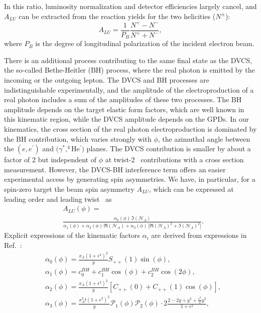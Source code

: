 \documentclass[twocolumn,nofootinbib,prl,superscriptaddress,secnumarabic,amssymb,nobibnotes,aps,floatfix]{revtex4}
\begin{document}
In this ratio, luminosity normalization and detector efficiencies largely 
cancel, and $A_{LU}$ can be extracted from the reaction yields for the two 
helicities ($N^{\pm}$):
\begin{equation}
A_{LU} = \frac{1}{P_{B}} \frac{N^{+} - N^{-}}{N^{+} + N^{-} },
\end{equation}
where $P_{B}$ is the degree of longitudinal polarization of the incident electron beam.

There is an additional process contributing to the same final state as the 
DVCS, the so-called Bethe-Heitler (BH) process, where the real photon is 
emitted by the incoming or the outgoing lepton. The DVCS and BH processes are 
indistinguishable experimentally, and the amplitude of the electroproduction of 
a real photon includes a sum of the amplitudes of these two processes. The BH 
amplitude depends on the target elastic form factors, which are well known in 
this kinematic region, while the DVCS amplitude depends on the GPDs. In our 
kinematics, the cross section of the real photon electroproduction is dominated 
by the BH contribution, which varies strongly with $\phi$, the azimuthal angle 
between the $(e,e^\prime)$ and $(\gamma^*,^4$He$^\prime)$ planes. The DVCS 
contribution is smaller by about a factor of 2 but independent of $\phi$ at 
twist-2~%
contributions with a cross section measurement. However, the DVCS-BH 
interference term offers an easier experimental access by generating spin 
asymmetries. We have, in particular, for a spin-zero target the beam spin 
asymmetry $A_{LU}$, which can be expressed at leading order and leading 
twist~\cite{Kirchner:2003wt,Belitsky:2008bz} as
\begin{equation}
\begin{split}
&A_{LU}(\phi) = \\
&\frac{\alpha_{0}(\phi) \, \Im (\mathcal{H}_{A})}
   {\alpha_{1}(\phi) + \alpha_{2}(\phi) \, \Re (\mathcal{H}_{A}) + 
   \alpha_{3}(\phi) \, \big[ \Re (\mathcal{H}_{A})^{2} + \Im 
(\mathcal{H}_{A})^{2} \big]}.
\end{split}
\label{eq:A_LU-coh}
\end{equation}
Explicit expressions of the kinematic factors $\alpha_i$ are derived from 
expressions in Ref.~\cite{Belitsky:2008bz}:
\begin{equation}
\begin{split}
&\alpha_0 (\phi)  = \frac{x_{A}(1+\epsilon^2)^2}{y} S_{++}(1) \sin(\phi), \\
&\alpha_1 (\phi)  =  c_0^{BH}+c_1^{BH} \cos({\phi})+c_2^{BH} \cos(2\phi), \\
&\alpha_2 (\phi)  =  \frac{x_{A}(1+\epsilon^2)^2}{y}  \left[ C_{++}(0) +  
C_{++}(1) \cos(\phi) \right], \\
&\alpha_3 (\phi) = \frac{x^{2}_{A}t(1+\epsilon^2)^2}{y} {\mathcal P}_1(\phi) 
{\mathcal P}_2(\phi) \cdot 2 \frac{2-2y+y^2 + \frac{\epsilon^2}{2}y^2}{1 + 
\epsilon^2},
\end{split}
\end{equation}
\end{document}
